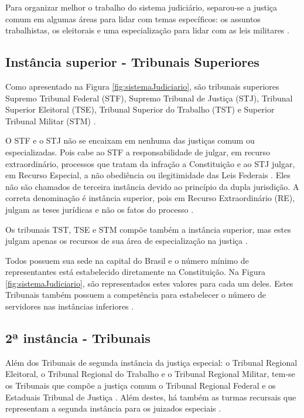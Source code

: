 Para organizar melhor o trabalho do sistema judiciário, separou-se a justiça comum em algumas áreas para lidar com temas específicos: os assuntos trabalhistas, os eleitorais e uma especialização para lidar com as leis militares \cite{JUNIOR2012}. 

\subsection{Instância superior - Tribunais Superiores}

Como apresentado na Figura \ref{fig:sistemaJudiciario}, são tribunais superiores Supremo Tribunal Federal (STF), Supremo Tribunal de Justiça (STJ), Tribunal Superior Eleitoral (TSE), Tribunal Superior do Trabalho (TST) e Superior Tribunal Militar (STM) \cite{BRASIL1988}.

O STF e o STJ não se encaixam em nenhuma das justiças comum ou especializadas. Pois cabe ao STF a responsabilidade de julgar, em recurso extraordinário, processos que tratam da infração a Constituição e ao STJ julgar, em Recurso Especial, a não obediência ou ilegitimidade das Leis Federais \cite{BRASIL1988}. Eles não são chamados de terceira instância devido ao princípio da dupla jurisdição. A correta denominação é instância superior, pois em Recurso Extraordinário (RE), julgam as teses jurídicas e não os fatos do processo \cite{JUNIOR2012}.

Os tribunais TST, TSE e STM compõe também a instância superior, mas estes julgam apenas os recursos de sua área de especialização na justiça \cite{BRASIL1988}.

Todos possuem sua sede na capital do Brasil e o número mínimo de representantes está estabelecido diretamente na Constituição. Na Figura \ref{fig:sistemaJudiciario}, são representados estes valores para cada um deles. Estes Tribunais também possuem a competência para estabelecer o número de servidores nas instâncias inferiores \cite{BRASIL1988}.

\subsection{2ª instância - Tribunais}

Além dos Tribunais de segunda instância da justiça especial: o Tribunal Regional Eleitoral, o Tribunal Regional do Trabalho e o Tribunal Regional Militar, tem-se os Tribunais que compõe a justiça comum o Tribunal Regional Federal e os Estaduais Tribunal de Justiça \cite{BRASIL1988}. Além destes, há também as turmas recursais que representam a segunda instância para os juizados especiais \cite{BRASIL2012}.

